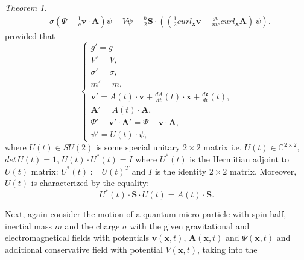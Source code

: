 \documentclass{article}
\newtheorem{theorem}{Theorem}[section]
\theoremstyle{definition}
\theoremstyle{remark}
\renewcommand{\vec}[1]{\mathbf{#1}}
\newtheorem{theorem}{Theorem}
\begin{document}
\begin{theorem}
\begin{multline}
%
%
%
+\sigma\left(\Psi-\frac{1}{c}\vec v\cdot\vec
A\right)\psi-V\psi+\frac{\hbar}{2}\vec
S\cdot\left(\left(\frac{1}{2}curl_{\vec x}\vec
v-\frac{g\sigma}{mc}curl_{\vec x}\vec A\right)\,\psi\right).
\end{multline}
provided that
\begin{equation}\label{yuythfgfyftydtydtydtyddyyyhhddhhhredPPN111hgghjgintintrrZZint}
\begin{cases}
g'=g\\
V'=V,\\
\sigma'=\sigma,\\
m'=m,\\
\vec v'=A(t)\cdot \vec v+\frac{dA}{dt}(t)\cdot\vec x+\frac{d\vec z}{dt}(t),\\
\vec A'=A(t)\cdot \vec A,\\
\Psi'-\vec v'\cdot\vec A'=\Psi-\vec v\cdot\vec A,\\
\psi'=U(t)\cdot\psi,
\end{cases}
\end{equation}
where $U(t)\in SU(2)$ is some special unitary $2\times 2$ matrix
i.e. $U(t)\in\mathbb{C}^{2\times 2}$, $det\,U(t)=1$, $U(t)\cdot
U^*(t)=I$ where $U^*(t)$ is the Hermitian adjoint to $U(t)$ matrix:
$U^*(t):=\bar U(t)^T$ and $I$ is the identity $2\times 2$ matrix.
Moreover, $U(t)$ is characterized by the equality:
\begin{equation}\label{gyfyfgfgfgghZZint}
U^*(t)\cdot\vec S\cdot U(t)=A(t)\cdot\vec S.
\end{equation}
\end{theorem}
Next, again consider the motion of a quantum micro-particle with
spin-half, inertial mass $m$ and the charge $\sigma$ with the given
gravitational and electromagnetical fields with potentials $\vec
v(\vec x,t)$, $\vec A(\vec x,t)$ and $\Psi(\vec x,t)$ and additional
conservative field with potential $V(\vec x,t)$, taking into the
\end{document}
